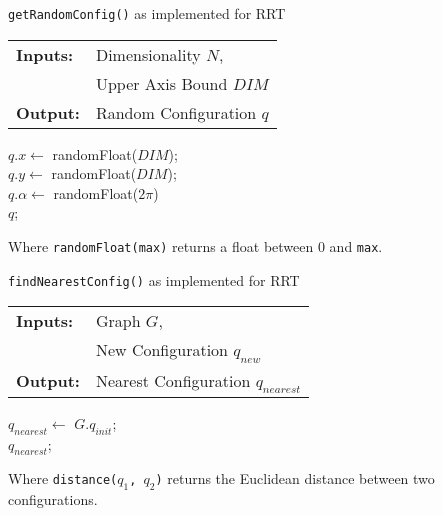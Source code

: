 
\bigskip
\begin{algorithm}[H]
    \caption{\texttt{getRandomConfig()} as implemented for \gls{RRT}}
    \SetAlgoLined
    \begin{tabular}{l l}
    \textbf{Inputs:}    & Dimensionality $N$,\\ 
                        & Upper Axis Bound $DIM$ \\
    \textbf{Output:}    & Random Configuration $q$ \\
    \end{tabular}

        $q.x \leftarrow$ randomFloat($DIM$); \\
        $q.y \leftarrow$ randomFloat($DIM$); \\
        $q.\alpha \leftarrow$ randomFloat($2\pi$) \\
        \Return $q$;\\
\end{algorithm}
\bigskip
Where \texttt{randomFloat(max)} returns a float between 0 and \texttt{max}.

\bigskip
\begin{algorithm}[H]
    \caption{\texttt{findNearestConfig()} as implemented for \gls{RRT}}
    \SetAlgoLined
    \begin{tabular}{l l}
    \textbf{Inputs:}    & Graph $G$, \\
                        & New Configuration $q_{new}$ \\
    \textbf{Output:}    & Nearest Configuration $q_{nearest}$ \\
    \end{tabular}

        $q_{nearest} \leftarrow$ $G$.$q_{init}$; \\
        \Return $q_{nearest}$; \\
\end{algorithm}
\bigskip
Where \texttt{distance($q_1$, $q_2$)} returns the Euclidean distance between two configurations.

